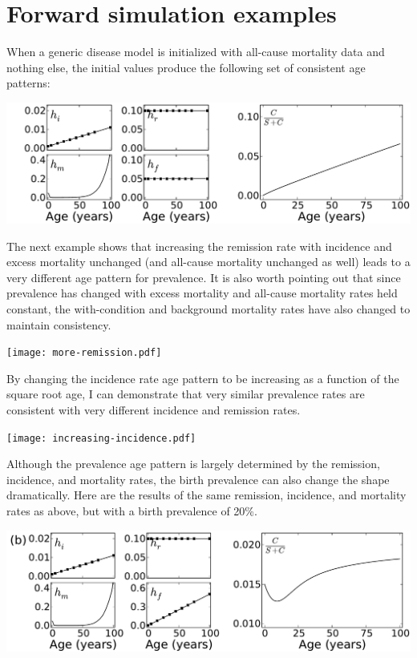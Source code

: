 \section{Forward simulation examples}

When a generic disease model is initialized with all-cause mortality
data and nothing else, the initial values produce the following set of
consistent age patterns:

\includegraphics[width=\textwidth]{initial.pdf}

The next example shows that increasing the remission rate with
incidence and excess mortality unchanged (and all-cause mortality
unchanged as well) leads to a very different age pattern for
prevalence. It is also worth pointing out that since prevalence has
changed with excess mortality and all-cause mortality rates held
constant, the with-condition and background mortality rates have also
changed to maintain consistency.

\texttt{[image: more-remission.pdf]}

By changing the incidence rate age pattern to be increasing as a
function of the square root age, I can demonstrate that very similar
prevalence rates are consistent with very different incidence and
remission rates.

\texttt{[image: increasing-incidence.pdf]}

Although the prevalence age pattern is largely determined by the
remission, incidence, and mortality rates, the birth prevalence can
also change the shape dramatically.  Here are the results of the same
remission, incidence, and mortality rates as above, but with a birth
prevalence of 20\%.

\includegraphics[width=\textwidth]{birth-prevalence.pdf}


